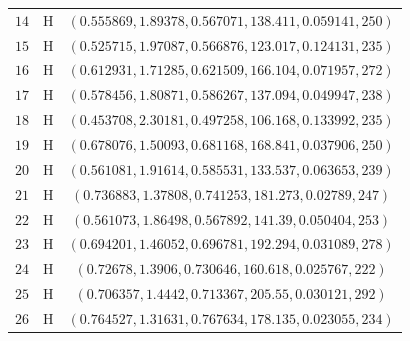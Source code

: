 \documentclass[\ifafour a4paper,12pt,\else a5paper,10pt,\fi%
onecolumn,oneside,article,%
british%
]{memoir}
\theoremstyle{remark}
\theoremstyle{innote}
\renewcommand*{\|}{\mathpunct{|}}
\newcommand*{\yH}{h}
\newcommand*{\yx}{x}
\newcommand*{\yxx}{\bm{\yx}}
\theoremstyle{plain}
\begin{document}
\begin{table}[!h]
\begin{tabular}[t]{@{}c@{\quad}c@{\quad}c@{}}
$14$ & H & $(0.555869, 1.89378, 0.567071, 138.411, 0.059141, 250)$ \\
$15$ & H & $(0.525715, 1.97087, 0.566876, 123.017, 0.124131, 235)$ \\
$16$ & H & $(0.612931, 1.71285, 0.621509, 166.104, 0.071957, 272)$ \\
$17$ & H & $(0.578456, 1.80871, 0.586267, 137.094, 0.049947, 238)$ \\
$18$ & H & $(0.453708, 2.30181, 0.497258, 106.168, 0.133992, 235)$ \\
$19$ & H & $(0.678076, 1.50093, 0.681168, 168.841, 0.037906, 250)$ \\
$20$ & H & $(0.561081, 1.91614, 0.585531, 133.537, 0.063653, 239)$ \\
$21$ & H & $(0.736883, 1.37808, 0.741253, 181.273, 0.02789, 247)$ \\
$22$ & H & $(0.561073, 1.86498, 0.567892, 141.39, 0.050404, 253)$ \\
$23$ & H & $(0.694201, 1.46052, 0.696781, 192.294, 0.031089, 278)$ \\
$24$ & H & $(0.72678, 1.3906, 0.730646, 160.618, 0.025767, 222)$ \\
$25$ & H & $(0.706357, 1.4442, 0.713367, 205.55, 0.030121, 292)$ \\
$26$ & H & $(0.764527, 1.31631, 0.767634, 178.135, 0.023055, 234)$ \\[4\jot]


\end{tabular}
\end{table}
\end{document}
